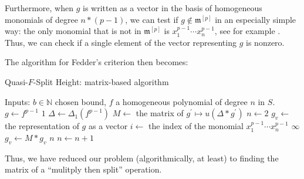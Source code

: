 Furthermore, when \(g\) is written as a vector 
in the basis of homogeneous monomials of degree
\(n*(p-1)\), we can test if \(g \notin \mathfrak{m}^{[p]}\) 
in an especially simple way: the only 
monomial that is not in \(\mathfrak{m}^{[p]}\) is
\(x_{1}^{p-1}\cdots x_{n}^{p-1}\), 
see for example \cite{kty-2022-fedder}.
Thus, we can check if a single element of the vector representing
\(g\) is nonzero.

The algorithm for Fedder's criterion then becomes:

\begin{algorithm}[H]
\caption{Quasi-\(F\)-Split Height: matrix-based algorithm}
\label{alg:qfs:matrix}
\begin{algorithmic}[1]
\State Inputs: \(b \in \mathbb{N}\) chosen bound, \(f\) a homogeneous
	polynomial of degree \(n\) in \(S\).
\State \(g \gets f^{p-1}\) 
    \State \Return \(1\) 
\EndIf
\State \(\Delta \gets \Delta_{1}(f^{p-1})\) 
\State \(M \gets\) the matrix of  \(g^{\prime} \mapsto u(\Delta * g^{\prime})\)
\State \(n \gets 2\) 
\State \(g_{v} \gets\) the representation of \(g\) as a vector
\State \(i \gets \) the index of the monomial \(x_{1}^{p-1}\cdots x_{n}^{p-1}\)
        \State \Return \(\infty\)
    \EndIf
    \State \(g_{v} \gets M * g_{v}\) 
        \State \Return \(n\) 
    \EndIf
    \State \(n \gets n + 1\)
\EndWhile
\end{algorithmic}
\end{algorithm}

Thus, we have reduced our problem (algorithmically, at least)
to finding the matrix of a ``mulitply then split'' operation.
%
% 


